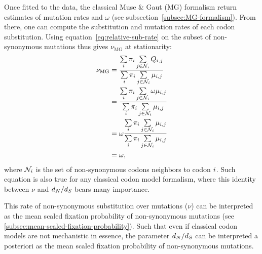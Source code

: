 Once fitted to the data, the classical Muse \& Gaut (MG) formalism return estimates of mutation rates and $\omega$ (see subsection~\ref{subsec:MG-formalism}).
From there, one can compute the substitution and mutation rates of each codon substitution.
Using equation~\ref{eq:relative-sub-rate} on the subset of non-synonymous mutations thus gives $\nu_{\text{MG}}$ at stationarity:
\begin{align}
    \nu_{\text{MG}} & = \dfrac{ \sum\limits_{{i}} \pi_{{i}} \sum\limits_{{j} \in \mathcal{N}_{{i}}} Q_{{i}, {j}}}{\sum\limits_{{i}} \pi_{{i}} \sum\limits_{{j} \in \mathcal{N}_{{i}}} \mu_{{i}, {j}}} \\
    & = \dfrac{ \sum\limits_{{i}} \pi_{{i}} \sum\limits_{{j} \in \mathcal{N}_{{i}}} \omega \mu_{{i}, {j}}}{\sum\limits_{{i}} \pi_{{i}} \sum\limits_{{j} \in \mathcal{N}_{{i}}} \mu_{{i}, {j}}} \\
    & = \omega \dfrac{ \sum\limits_{{i}} \pi_{{i}} \sum\limits_{{j} \in \mathcal{N}_{{i}}} \mu_{{i}, {j}}}{\sum\limits_{{i}} \pi_{{i}} \sum\limits_{{j} \in \mathcal{N}_{{i}}} \mu_{{i}, {j}}} \\
    & = \omega,
\end{align}
where $\mathcal{N}_{{i}}$ is the set of non-synonymous \glspl{codon} neighbors to \gls{codon} ${i}$.
Such equation is also true for any classical codon model formalism, where this identity between $\nu$ and $d_N / d_S$ bears many importance.

This rate of non-synonymous substitution over mutations ($\nu$) can be interpreted as the mean scaled fixation probability of non-synonymous mutations (see \ref{subsec:mean-scaled-fixation-probability}).
Such that even if classical codon models are not mechanistic in essence, the parameter $d_N / d_S$ can be interpreted a posteriori as the mean scaled fixation probability of non-synonymous mutations.

